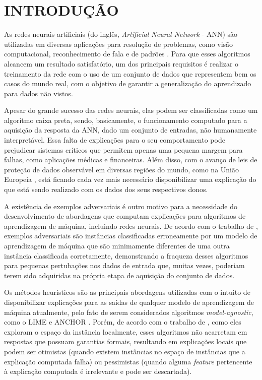 \chapter{INTRODUÇÃO}
\thispagestyle{empty}

As redes neurais artificiais (do inglês, \textit{Artificial Neural Network} - ANN) são utilizadas em diversas aplicações para resolução de problemas, como visão computacional, reconhecimento de fala e de padrões \cite{applications}. Para que esses algoritmos alcancem um resultado satisfatório, um dos principais requisitos é realizar o treinamento da rede com o uso de um conjunto de dados que representem bem os casos do mundo real, com o objetivo de garantir a generalização do aprendizado para dados não vistos.

Apesar do grande sucesso das redes neurais, elas podem ser classificadas como um algoritmo caixa preta, sendo, basicamente, o funcionamento computado para a aquisição da resposta da ANN, dado um conjunto de entradas, não humanamente interpretável. Essa falta de explicações para o seu comportamento pode prejudicar sistemas críticos que permitem apenas uma pequena margem para falhas, como aplicações médicas e financeiras. Além disso, com o avanço de leis de proteção de dados observável em diversas regiões do mundo, como na União Europeia \cite{lei_EU}, está ficando cada vez mais necessário disponibilizar uma explicação do que está sendo realizado com os dados dos seus respectivos donos. 

A existência de exemplos adversariais é outro motivo para a necessidade do desenvolvimento de abordagens que computam explicações para algoritmos de aprendizagem de máquina, incluindo redes neurais. De acordo com o trabalho de , exemplos adversariais são instâncias classificadas erroneamente por um modelo de aprendizagem de máquina que são minimamente diferentes de uma outra instância classificada corretamente, demonstrando a fraqueza desses algoritmos para pequenas pertubações nos dados de entrada que, muitas vezes, poderiam terem sido adquiridas na própria etapa de aquisição do conjunto de dados. 

Os métodos heurísticos são as principais abordagens utilizadas com o intuito de disponibilizar explicações para as saídas de qualquer modelo de aprendizagem de máquina atualmente, pelo fato de serem considerados algoritmos \textit{model-agnostic}, como o LIME \cite{LIME} e ANCHOR \cite{ANCHOR}. Porém, de acordo com o trabalho de , como eles exploram o espaço da instância localmente, esses algoritmos não acarretam em respostas que possuam garantias formais, resultando em explicações locais que podem ser otimistas (quando existem instâncias no espaço de instâncias que a explicação computada falha) ou pessimistas (quando alguma \textit{feature} pertencente à explicação computada é irrelevante e pode ser descartada).

